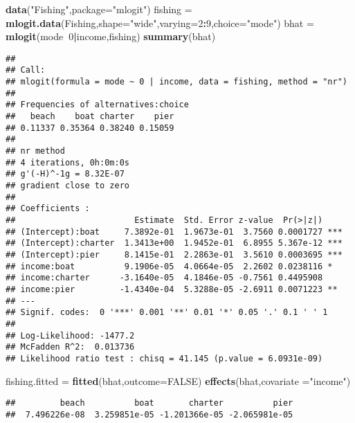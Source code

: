 \documentclass[
]{article}
\newenvironment{Shaded}{\begin{snugshade}}{\end{snugshade}}
\newcommand{\DataTypeTok}[1]{\textcolor[rgb]{0.13,0.29,0.53}{#1}}
\newcommand{\DecValTok}[1]{\textcolor[rgb]{0.00,0.00,0.81}{#1}}
\newcommand{\KeywordTok}[1]{\textcolor[rgb]{0.13,0.29,0.53}{\textbf{#1}}}
\newcommand{\NormalTok}[1]{#1}
\newcommand{\OperatorTok}[1]{\textcolor[rgb]{0.81,0.36,0.00}{\textbf{#1}}}
\newcommand{\OtherTok}[1]{\textcolor[rgb]{0.56,0.35,0.01}{#1}}
\newcommand{\StringTok}[1]{\textcolor[rgb]{0.31,0.60,0.02}{#1}}
\begin{document}
\begin{Shaded}
\begin{Highlighting}[]
\KeywordTok{data}\NormalTok{(}\StringTok{"Fishing"}\NormalTok{,}\DataTypeTok{package=}\StringTok{"mlogit"}\NormalTok{)}
\NormalTok{fishing             =}\StringTok{ }\KeywordTok{mlogit.data}\NormalTok{(Fishing,}\DataTypeTok{shape=}\StringTok{"wide"}\NormalTok{,}\DataTypeTok{varying=}\DecValTok{2}\OperatorTok{:}\DecValTok{9}\NormalTok{,}\DataTypeTok{choice=}\StringTok{"mode"}\NormalTok{)}
\NormalTok{bhat                =}\StringTok{ }\KeywordTok{mlogit}\NormalTok{(mode}\OperatorTok{~}\DecValTok{0}\OperatorTok{|}\NormalTok{income,fishing)}
\KeywordTok{summary}\NormalTok{(bhat)}
\end{Highlighting}
\end{Shaded}

\begin{verbatim}
## 
## Call:
## mlogit(formula = mode ~ 0 | income, data = fishing, method = "nr")
## 
## Frequencies of alternatives:choice
##   beach    boat charter    pier 
## 0.11337 0.35364 0.38240 0.15059 
## 
## nr method
## 4 iterations, 0h:0m:0s 
## g'(-H)^-1g = 8.32E-07 
## gradient close to zero 
## 
## Coefficients :
##                        Estimate  Std. Error z-value  Pr(>|z|)    
## (Intercept):boat     7.3892e-01  1.9673e-01  3.7560 0.0001727 ***
## (Intercept):charter  1.3413e+00  1.9452e-01  6.8955 5.367e-12 ***
## (Intercept):pier     8.1415e-01  2.2863e-01  3.5610 0.0003695 ***
## income:boat          9.1906e-05  4.0664e-05  2.2602 0.0238116 *  
## income:charter      -3.1640e-05  4.1846e-05 -0.7561 0.4495908    
## income:pier         -1.4340e-04  5.3288e-05 -2.6911 0.0071223 ** 
## ---
## Signif. codes:  0 '***' 0.001 '**' 0.01 '*' 0.05 '.' 0.1 ' ' 1
## 
## Log-Likelihood: -1477.2
## McFadden R^2:  0.013736 
## Likelihood ratio test : chisq = 41.145 (p.value = 6.0931e-09)
\end{verbatim}

\begin{Shaded}
\begin{Highlighting}[]
\NormalTok{fishing.fitted      =}\StringTok{ }\KeywordTok{fitted}\NormalTok{(bhat,}\DataTypeTok{outcome=}\OtherTok{FALSE}\NormalTok{)}
\KeywordTok{effects}\NormalTok{(bhat,}\DataTypeTok{covariate =}\StringTok{"income"}\NormalTok{)}
\end{Highlighting}
\end{Shaded}

\begin{verbatim}
##         beach          boat       charter          pier 
##  7.496226e-08  3.259851e-05 -1.201366e-05 -2.065981e-05
\end{verbatim}
\end{document}
